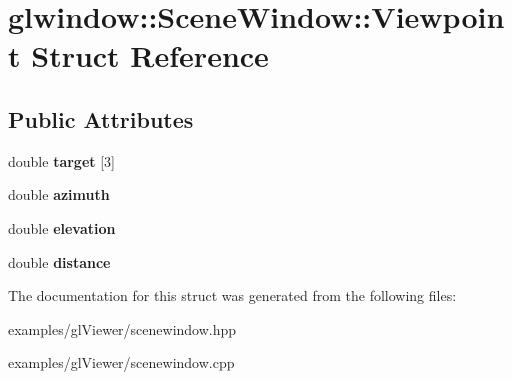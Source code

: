 \hypertarget{structglwindow_1_1_scene_window_1_1_viewpoint}{}\section{glwindow\+:\+:Scene\+Window\+:\+:Viewpoint Struct Reference}
\label{structglwindow_1_1_scene_window_1_1_viewpoint}
\subsection*{Public Attributes}
\begin{DoxyCompactItemize}
\item 
\mbox{\label{structglwindow_1_1_scene_window_1_1_viewpoint_a48d71514393c6538f2753b219ec25e1e}} 
double {\bfseries target} \mbox{[}3\mbox{]}
\item 
\mbox{\label{structglwindow_1_1_scene_window_1_1_viewpoint_a2c4761518908d5af7812a2427275b9da}} 
double {\bfseries azimuth}
\item 
\mbox{\label{structglwindow_1_1_scene_window_1_1_viewpoint_a019ecd110fdfc130d30318e728198718}} 
double {\bfseries elevation}
\item 
\mbox{\label{structglwindow_1_1_scene_window_1_1_viewpoint_ab9bf343d65bfd4a4ef814c812ab92136}} 
double {\bfseries distance}
\end{DoxyCompactItemize}


The documentation for this struct was generated from the following files\+:\begin{DoxyCompactItemize}
\item 
examples/gl\+Viewer/scenewindow.\+hpp\item 
examples/gl\+Viewer/scenewindow.\+cpp\end{DoxyCompactItemize}
